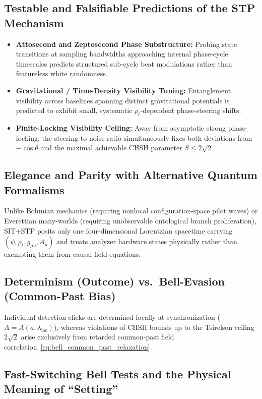 \subsection{Testable and Falsifiable Predictions of the STP Mechanism}

\begin{itemize}
  \item \textbf{Attosecond and Zeptosecond Phase Substructure:} Probing state transitions at sampling bandwidths approaching internal phase-cycle timescales predicts structured sub-cycle beat modulations rather than featureless white randomness.
  \item \textbf{Gravitational / Time-Density Visibility Tuning:} Entanglement visibility across baselines spanning distinct gravitational potentials is predicted to exhibit small, systematic $\rho_t$-dependent phase-steering shifts.
  \item \textbf{Finite-Locking Visibility Ceiling:} Away from asymptotic strong phase-locking, the steering-to-noise ratio simultaneously fixes both deviations from $-\cos\theta$ and the maximal achievable CHSH parameter $S \le 2\sqrt{2}$.
\end{itemize}

\subsection{Elegance and Parity with Alternative Quantum Formalisms}

Unlike Bohmian mechanics (requiring nonlocal configuration-space pilot waves) or Everettian many-worlds (requiring unobservable ontological branch proliferation), SIT+STP posits only one four-dimensional Lorentzian spacetime carrying $(\psi, \rho_t, g_{\mu\nu}, A_\mu)$ and treats analyzer hardware states physically rather than exempting them from causal field equations.

\subsection{Determinism (Outcome) vs.\ Bell-Evasion (Common-Past Bias)}

Individual detection clicks are determined locally at synchronization ($A = A(a,\lambda_{\mathrm{loc}})$), whereas violations of CHSH bounds up to the Tsirelson ceiling $2\sqrt{2}$ arise exclusively from retarded common-past field correlation~\eqref{eq:bell_common_past_relaxation}.

\subsection{Fast-Switching Bell Tests and the Physical Meaning of ``Setting''}

